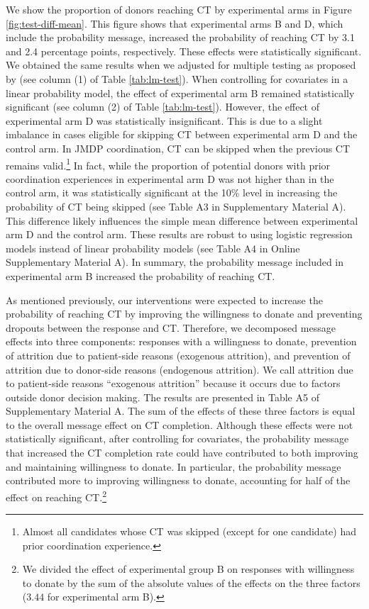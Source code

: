 \documentclass[12pt, a4paper]{article}
\begin{document}
We show the proportion of donors reaching CT by experimental arms in Figure \ref{fig:test-diff-mean}. This figure shows that experimental arms B and D, which include the probability message, increased the probability of reaching CT by 3.1 and 2.4 percentage points, respectively. These effects were statistically significant. We obtained the same results when we adjusted for multiple testing as proposed by \citet{List2019} (see column (1) of Table \ref{tab:lm-test}). When controlling for covariates in a linear probability model, the effect of experimental arm B remained statistically significant (see column (2) of Table \ref{tab:lm-test}). However, the effect of experimental arm D was statistically insignificant. This is due to a slight imbalance in cases eligible for skipping CT between experimental arm D and the control arm. In JMDP coordination, CT can be skipped when the previous CT remains valid.\footnote{Almost all candidates whose CT was skipped (except for one candidate) had prior coordination experience.} In fact, while the proportion of potential donors with prior coordination experiences in experimental arm D was not higher than in the control arm, it was statistically significant at the 10\% level in increasing the probability of CT being skipped (see Table A3 in Supplementary Material A). This difference likely influences the simple mean difference between experimental arm D and the control arm. These results are robust to using logistic regression models instead of linear probability models (see Table A4 in Online Supplementary Material A). In summary, the probability message included in experimental arm B increased the probability of reaching CT.

As mentioned previously, our interventions were expected to increase the probability of reaching CT by improving the willingness to donate and preventing dropouts between the response and CT. Therefore, we decomposed message effects into three components: responses with a willingness to donate, prevention of attrition due to patient-side reasons (exogenous attrition), and prevention of attrition due to donor-side reasons (endogenous attrition). We call attrition due to patient-side reasons ``exogenous attrition'' because it occurs due to factors outside donor decision making. The results are presented in Table A5 of Supplementary Material A. The sum of the effects of these three factors is equal to the overall message effect on CT completion. Although these effects were not statistically significant, after controlling for covariates, the probability message that increased the CT completion rate could have contributed to both improving and maintaining willingness to donate. In particular, the probability message contributed more to improving willingness to donate, accounting for half of the effect on reaching CT.\footnote{We divided the effect of experimental group B on responses with willingness to donate by the sum of the absolute values of the effects on the three factors (\(3.44\) for experimental arm B).}
\end{document}
